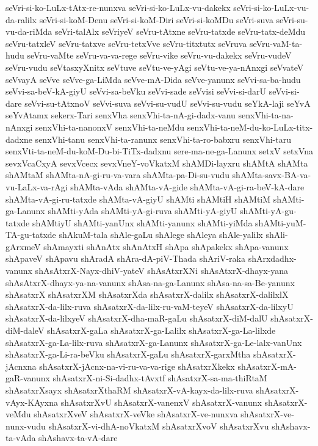 {seVri-si-ko-LuLx-tAtx-re-nunxva
seVri-si-ko-LuLx-vu-dakekx
seVri-si-ko-LuLx-vu-da-ralilx
seVri-si-koM-Denu
seVri-si-koM-Diri
seVri-si-koMDu
seVri-suva
seVri-su-vu-da-riMda
seVri-talAlx
seVriyeV
seVru-tAtxne
seVru-tatxde
seVru-tatx-deMdu
seVru-tatxleV
seVru-tatxve
seVru-tetxVve
seVru-titxtutx
seVruva
seVru-vaM-ta-hudu
seVru-vaMte
seVru-va-va-rege
seVru-vike
seVru-vu-dakekx
seVru-vudeV
seVru-vudu
seVtasxyXnitx
seVtuve
seVtu-ve-yAgi
seVtu-ve-ya-nAnxgi
seVvateV
seVvayA
seVve
seVve-ga-LiMda
seVve-mA-Dida
seVve-yanunx
seVvi-sa-ba-hudu
seVvi-sa-beV-kA-giyU
seVvi-sa-beVku
seVvi-sade
seVvisi
seVvi-si-darU
seVvi-si-dare
seVvi-su-tAtxnoV
seVvi-suva
seVvi-su-vudU
seVvi-su-vudu
seYkA-laji
seYvA
seYvAtamx
sekerx-Tari
senxVha
senxVhi-ta-nA-gi-dadx-vanu
senxVhi-ta-na-nAnxgi
senxVhi-ta-nanonxV
senxVhi-ta-neMdu
senxVhi-ta-neM-du-ko-LuLx-titx-dadxne
senxVhi-tanu
senxVhi-ta-ranunx
senxVhi-ta-ro-babxru
senxVhi-taru
senxVti-ta-neM-du-koM-Du-bi-TiTx-dadxnu
sere-ma-ne-ga-Lanunx
setxV
setxVna
sevxVcaCxyA
sevxVcecx
sevxVneY-voVkatxM
shAMDi-layxru
shAMtA
shAMta
shAMtaM
shAMta-nA-gi-ru-va-vara
shAMta-pa-Di-su-vudu
shAMta-savx-BA-va-vu-LaLx-va-rAgi
shAMta-vAda
shAMta-vA-gide
shAMta-vA-gi-ra-beV-kA-dare
shAMta-vA-gi-ru-tatxde
shAMta-vA-giyU
shAMti
shAMtiH
shAMtiM
shAMti-ga-Lanunx
shAMti-yAda
shAMti-yA-gi-ruva
shAMti-yA-giyU
shAMti-yA-gu-tatxde
shAMtiyU
shAMti-yanUnx
shAMti-yanunx
shAMti-yiMda
shAMti-yuM-TA-gu-tatxde
shAkuM-tala
shAle-gaLu
shAlege
shAleya
shAle-yalilx
shAli-gArxmeV
shAmayxti
shAnAtx
shAnAtxH
shApa
shApakekx
shApa-vanunx
shApaveV
shApavu
shAradA
shAra-dA-piV-Thada
shAriV-raka
shArxdadhx-vanunx
shAsAtxrX-Nayx-dhiV-yateV
shAsAtxrXNi
shAsAtxrX-dhayx-yana
shAsAtxrX-dhayx-ya-na-vanunx
shAsa-na-ga-Lanunx
shAsa-na-sa-Be-yanunx
shAsatxrX
shAsatxrXM
shAsatxrXda
shAsatxrX-dalilx
shAsatxrX-dalilxlX
shAsatxrX-da-lilx-ruva
shAsatxrX-da-lilx-ru-vaM-teyeV
shAsatxrX-da-lilxyU
shAsatxrX-da-lilxyeV
shAsatxrX-dha-maR-gaLu
shAsatxrX-diM-dalU
shAsatxrX-diM-daleV
shAsatxrX-gaLa
shAsatxrX-ga-Lalilx
shAsatxrX-ga-La-lilxde
shAsatxrX-ga-La-lilx-ruva
shAsatxrX-ga-Lanunx
shAsatxrX-ga-Le-lalx-vanUnx
shAsatxrX-ga-Li-ra-beVku
shAsatxrX-gaLu
shAsatxrX-garxMtha
shAsatxrX-jAcnxna
shAsatxrX-jAcnx-na-vi-ru-va-va-rige
shAsatxrXkekx
shAsatxrX-mA-gaR-vanunx
shAsatxrX-ni-Si-dadhx-tAvxtf
shAsatxrX-sa-ma-thiRtaM
shAsatxrXsayx
shAsatxrXthaRM
shAsatxrX-vA-kayx-da-lilx-ruva
shAsatxrX-vAyx-KAyxna
shAsatxrXvU
shAsatxrX-vanenxV
shAsatxrX-vanunx
shAsatxrX-veMdu
shAsatxrXveV
shAsatxrX-veVke
shAsatxrX-ve-nunxva
shAsatxrX-ve-nunx-vudu
shAsatxrX-vi-dhA-noVkatxM
shAsatxrXvoV
shAsatxrXvu
shAshavx-ta-vAda
shAshavx-ta-vA-dare
}
